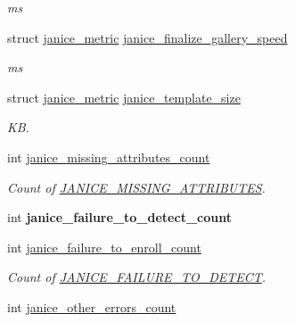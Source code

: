 \begin{DoxyCompactItemize}
\begin{DoxyCompactList}\small\item\em ms \end{DoxyCompactList}\item 
\hypertarget{structjanice__metrics_a8fa822b7755cf0e7f075a8bc4eb9c6df}{}struct \hyperlink{structjanice__metric}{janice\+\_\+metric} \hyperlink{structjanice__metrics_a8fa822b7755cf0e7f075a8bc4eb9c6df}{janice\+\_\+finalize\+\_\+gallery\+\_\+speed}\label{structjanice__metrics_a8fa822b7755cf0e7f075a8bc4eb9c6df}

\begin{DoxyCompactList}\small\item\em ms \end{DoxyCompactList}\item 
\hypertarget{structjanice__metrics_ae81fd05b2227e9a14504336ce5984b10}{}struct \hyperlink{structjanice__metric}{janice\+\_\+metric} \hyperlink{structjanice__metrics_ae81fd05b2227e9a14504336ce5984b10}{janice\+\_\+template\+\_\+size}\label{structjanice__metrics_ae81fd05b2227e9a14504336ce5984b10}

\begin{DoxyCompactList}\small\item\em K\+B. \end{DoxyCompactList}\item 
\hypertarget{structjanice__metrics_a07d2d55dc7cc2f0ce102716c48b6bf19}{}int \hyperlink{structjanice__metrics_a07d2d55dc7cc2f0ce102716c48b6bf19}{janice\+\_\+missing\+\_\+attributes\+\_\+count}\label{structjanice__metrics_a07d2d55dc7cc2f0ce102716c48b6bf19}

\begin{DoxyCompactList}\small\item\em Count of \hyperlink{group__janice_gga4873d49c1f9d6a6880dfbd485cf6ba72a3769c1a562e8b70e94b183cfeabc2d66}{J\+A\+N\+I\+C\+E\+\_\+\+M\+I\+S\+S\+I\+N\+G\+\_\+\+A\+T\+T\+R\+I\+B\+U\+T\+E\+S}. \end{DoxyCompactList}\item 
\hypertarget{structjanice__metrics_ac0c7fbba3089e0478111d569a421f795}{}int {\bfseries janice\+\_\+failure\+\_\+to\+\_\+detect\+\_\+count}\label{structjanice__metrics_ac0c7fbba3089e0478111d569a421f795}

\item 
int \hyperlink{structjanice__metrics_ac35a8c6f5a0e480e62a4a0c657d57ee9}{janice\+\_\+failure\+\_\+to\+\_\+enroll\+\_\+count}
\begin{DoxyCompactList}\small\item\em Count of \hyperlink{group__janice_gga4873d49c1f9d6a6880dfbd485cf6ba72a4123e451be0cc17446e73331a5886749}{J\+A\+N\+I\+C\+E\+\_\+\+F\+A\+I\+L\+U\+R\+E\+\_\+\+T\+O\+\_\+\+D\+E\+T\+E\+C\+T}. \end{DoxyCompactList}\item 
\hypertarget{structjanice__metrics_a620bf0ff93864d92acb0b983c6746575}{}int \hyperlink{structjanice__metrics_a620bf0ff93864d92acb0b983c6746575}{janice\+\_\+other\+\_\+errors\+\_\+count}\label{structjanice__metrics_a620bf0ff93864d92acb0b983c6746575}


\end{DoxyCompactItemize}
